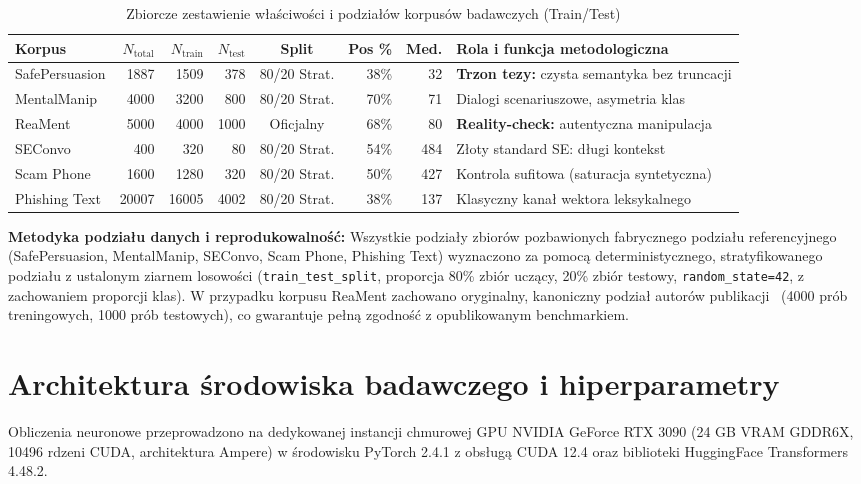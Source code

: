 \documentclass[12pt,a4paper,twoside]{report}
\begin{document}
\begin{table}[H]\centering
\footnotesize
\caption[Właściwości i podziały korpusów badawczych (Train/Test)]{Zbiorcze zestawienie właściwości i podziałów korpusów badawczych (Train/Test)}\label{tab:datasets_full}
\begin{tabularx}{\textwidth}{l r r r c r r X}
\toprule
\rowcolor{headerblue}
\color{white}\textbf{Korpus} &
\color{white}\textbf{$N_{\text{total}}$} &
\color{white}\textbf{$N_{\text{train}}$} &
\color{white}\textbf{$N_{\text{test}}$} &
\color{white}\textbf{Split} &
\color{white}\textbf{Pos \%} &
\color{white}\textbf{Med.} &
\color{white}\textbf{Rola i funkcja metodologiczna} \\
\midrule
SafePersuasion & 1887  & 1509  & 378  & 80/20 Strat. & 38\% & 32  & \textbf{Trzon tezy:} czysta semantyka bez truncacji \\
MentalManip    & 4000  & 3200  & 800  & 80/20 Strat. & 70\% & 71  & Dialogi scenariuszowe, asymetria klas \\
ReaMent        & 5000  & 4000  & 1000 & Oficjalny   & 68\% & 80  & \textbf{Reality-check:} autentyczna manipulacja \\
SEConvo        & 400   & 320   & 80   & 80/20 Strat. & 54\% & 484 & Złoty standard SE: długi kontekst \\
Scam Phone     & 1600  & 1280  & 320  & 80/20 Strat. & 50\% & 427 & Kontrola sufitowa (saturacja syntetyczna) \\
Phishing Text  & 20007 & 16005 & 4002 & 80/20 Strat. & 38\% & 137 & Klasyczny kanał wektora leksykalnego \\
\bottomrule
\end{tabularx}
\end{table}

\noindent\textbf{Metodyka podziału danych i reprodukowalność:} Wszystkie podziały zbiorów pozbawionych fabrycznego podziału referencyjnego (SafePersuasion, MentalManip, SEConvo, Scam Phone, Phishing Text) wyznaczono za pomocą deterministycznego, stratyfikowanego podziału z ustalonym ziarnem losowości (\texttt{train\_test\_split}, proporcja 80\% zbiór uczący, 20\% zbiór testowy, \texttt{random\_state=42}, z zachowaniem proporcji klas). W przypadku korpusu ReaMent zachowano oryginalny, kanoniczny podział autorów publikacji~\cite{reament2026} (4000 prób treningowych, 1000 prób testowych), co gwarantuje pełną zgodność z opublikowanym benchmarkiem.

\section{Architektura środowiska badawczego i hiperparametry}
Obliczenia neuronowe przeprowadzono na dedykowanej instancji chmurowej GPU NVIDIA GeForce RTX 3090 (24 GB VRAM GDDR6X, 10496 rdzeni CUDA, architektura Ampere) w środowisku PyTorch 2.4.1 z obsługą CUDA 12.4 oraz biblioteki HuggingFace Transformers 4.48.2.
\end{document}
